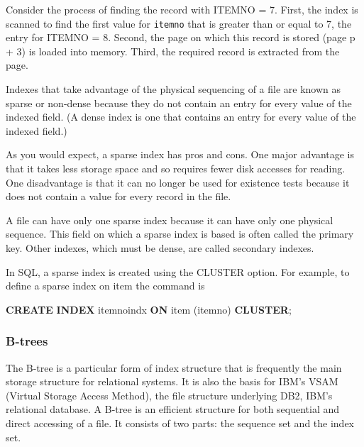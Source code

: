 \documentclass[
]{article}
\newenvironment{Shaded}{\begin{snugshade}}{\end{snugshade}}
\newcommand{\KeywordTok}[1]{\textcolor[rgb]{0.13,0.29,0.53}{\textbf{#1}}}
\newcommand{\NormalTok}[1]{#1}
\begin{document}
Consider the process of finding the record with ITEMNO = 7. First, the
index is scanned to find the first value for \texttt{itemno} that is greater
than or equal to 7, the entry for ITEMNO = 8. Second, the page on which
this record is stored (page p + 3) is loaded into memory. Third, the
required record is extracted from the page.

Indexes that take advantage of the physical sequencing of a file are
known as sparse or non-dense because they do not contain an entry for
every value of the indexed field. (A dense index is one that contains an
entry for every value of the indexed field.)

As you would expect, a sparse index has pros and cons. One major
advantage is that it takes less storage space and so requires fewer disk
accesses for reading. One disadvantage is that it can no longer be used
for existence tests because it does not contain a value for every record
in the file.

A file can have only one sparse index because it can have only one
physical sequence. This field on which a sparse index is based is often
called the primary key. Other indexes, which must be dense, are called
secondary indexes.

In SQL, a sparse index is created using the CLUSTER option. For example,
to define a sparse index on item the command is

\begin{Shaded}
\begin{Highlighting}[]
\KeywordTok{CREATE} \KeywordTok{INDEX}\NormalTok{ itemnoindx }\KeywordTok{ON}\NormalTok{ item (itemno) }\KeywordTok{CLUSTER}\NormalTok{;}
\end{Highlighting}
\end{Shaded}

\hypertarget{b-trees}{%
\subsubsection*{B-trees}\label{b-trees}}

The B-tree is a particular form of index structure that is frequently
the main storage structure for relational systems. It is also the basis
for IBM's VSAM (Virtual Storage Access Method), the file structure
underlying DB2, IBM's relational database. A B-tree is an efficient
structure for both sequential and direct accessing of a file. It
consists of two parts: the sequence set and the index set.
\end{document}
